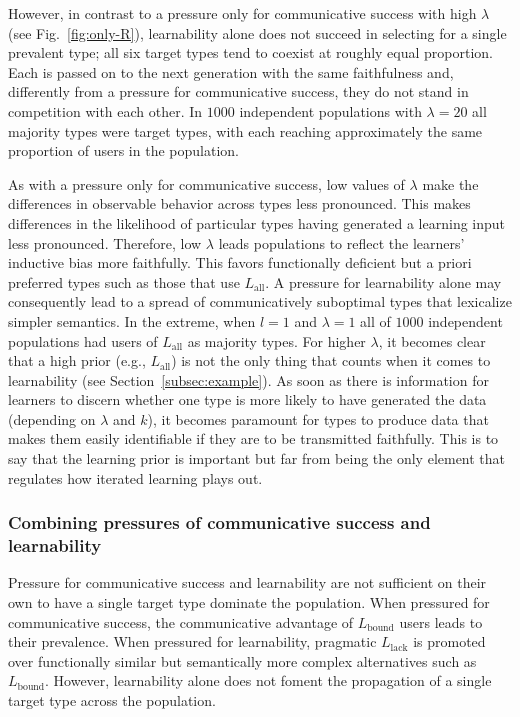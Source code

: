 \documentclass[a4paper, 11pt]{article}
\theoremstyle{Satz}
\newcommand{\mylang}[1]{\ensuremath{L_{\text{#1}}}\xspace} %
\newcommand{\Lall}{\mylang{all}}
\newcommand{\Lbound}{\mylang{bound}}
\newcommand{\Llack}{\mylang{lack}}
\begin{document}
However, in contrast to a pressure only for communicative success with high $\lambda$ (see
Fig.~\ref{fig:only-R}), learnability alone does not succeed in selecting for a single
prevalent type; all six target types tend to coexist at roughly equal proportion. Each
is passed on to the next generation with the same faithfulness and, differently from a pressure
for communicative success, they do not stand in competition with each other. In $1000$
independent populations with $\lambda = 20$ all majority types were target types,
with each reaching approximately the same proportion of users in the population.

As with a pressure only for communicative success, low values of $\lambda$ make the differences in observable behavior across types less pronounced. This makes differences in the likelihood of particular types having generated a learning input less pronounced. Therefore, low $\lambda$ leads populations to reflect the learners' inductive bias more faithfully. This favors functionally deficient but a priori preferred types such as those that use  $\Lall$. A pressure for learnability alone may consequently lead to a spread of communicatively suboptimal types that lexicalize simpler semantics. In the extreme, when $l = 1$ and $\lambda = 1$ all
of $1000$ independent populations had users of $\Lall$ as majority types. For higher $\lambda$, it becomes clear that a high prior (e.g., $\Lall$) is not the only thing that counts when it comes to learnability (see Section~\ref{subsec:example}). As soon as there is information for learners to discern whether one type is more likely to have generated the data (depending on $\lambda$ and $k$), it becomes paramount for types to produce data that makes them easily identifiable if they are to be transmitted faithfully. This is to say that the learning prior is important but far from being the only element that regulates how iterated learning plays out.  


\subsubsection{Combining pressures of communicative success and learnability}

Pressure for communicative success and learnability are not sufficient on their own to have a
single target type dominate the population. When pressured for communicative success, the  communicative advantage of $\Lbound$ users leads to their prevalence. When pressured for
learnability, pragmatic $\Llack$ is promoted over functionally similar but semantically more
complex alternatives such as $\Lbound$. However, learnability alone does not foment the
propagation of a single target type across the population.
\end{document}
